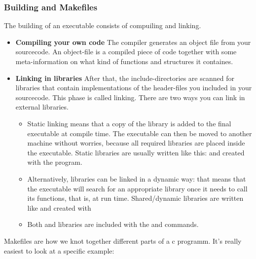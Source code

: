 \subsubsection{Building and Makefiles}
The building of an executable consists of compuiling and linking. 
\begin{itemize}
    \item \textbf{Compiling your own code} The compiler generates an object file from your sourcecode. An object-file is a compiled piece of code together with some meta-information on what kind of functions and structures it containes. 
    \item \textbf{Linking in libraries} After that, the include-directories are scanned for libraries that contain implementations of the header-files you included in your sourcecode. This phase is called linking. There are two ways you can link in external libraries.
    \begin{itemize}
        \item Static linking means that a copy of the library is added to the final executable at compile time. The executable can then be moved to another machine without worries, because all required libraries are placed inside the executable. Static libraries are usually written like this:  and created with the  program.
        \item  Alternatively, libraries can be linked in a dynamic way: that means that the executable will search for an appropriate library once it needs to call its functions, that is, at run time.  Shared/dynamic libraries are written like  and created with 
        \item Both  and  libraries are included with the  and  commands. 
    \end{itemize}
\end{itemize}

Makefiles are how we knot together different parts of a c programm. It's really easiest to look at a specific example:

